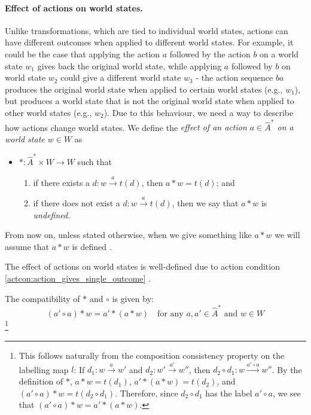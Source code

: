 \paragraph{Effect of actions on world states.}
Unlike transformations, which are tied to individual world states, actions can have different outcomes when applied to different world states.
For example, it could be the case that applying the action $a$ followed by the action $b$ on a world state $w_{1}$ gives back the original world state, while applying $a$ followed by $b$ on world state $w_{2}$ could give a different world state $w_{3}$ - the action sequence $ba$ produces the original world state when applied to certain world states (e.g., $w_{1}$), but produces a world state that is not the original world state when applied to other world states (e.g., $w_{2}$).
Due to this behaviour, we need a way to describe how actions change world states.
We define the \emph{effect of an action $a \in \hat{A}^{\ast}$ on a world state $w \in W$} as

\begin{itemize}
	\item[] $\ast: \hat{A}^{\ast} \times W \to W$ such that
	      \begin{enumerate}
		      \item if there exists a $d: w \xrightarrow{a} t(d)$, then $a \ast w = t(d)$; and
		      \item if there does not exist a $d: w \xrightarrow{a} t(d)$, then we say that $a \ast w$ is \emph{undefined}.
	      \end{enumerate}
\end{itemize}
From now on, unless stated otherwise, when we give something like $a \ast w$ we will assume that $a \ast w$ is defined .


The effect of actions on world states is well-defined due to action condition \ref{actcon:action_gives_single_outcome} .

The compatibility of $\ast$ and $\circ$ is given by:
\begin{equation}\label{eqn:circ_ast_compatibility}
	(a' \circ a) \ast w = a' \ast (a \ast w) \quad \text{for any $a, a' \in \hat{A}^{\ast}$ and $w \in W$}
\end{equation}
\footnote{
	This follows naturally from the composition consistency property on the labelling map $l$:
	If $d_{1}: w \xrightarrow{a} w'$ and $d_{2}: w' \xrightarrow{a'} w''$, then $d_{2} \circ d_{1}: w \xrightarrow{a' \circ a} w''$.
	By the definition of $\ast$, $a * w = t(d_{1})$, $a' \ast (a \ast w) = t(d_{2})$, and $(a' \circ a) \ast w = t(d_{2} \circ d_{1})$.
	Therefore, since $d_{2} \circ d_{1}$ has the label $a' \circ a$, we see that $(a' \circ a) \ast w = a' \ast (a \ast w)$.
}

